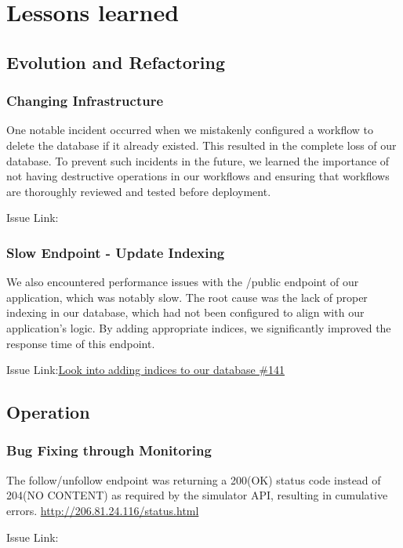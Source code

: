 \section{Lessons learned}
\subsection{Evolution and Refactoring}

\subsubsection{Changing Infrastructure}
One notable incident occurred when we mistakenly configured a workflow to delete the database if it already existed. This resulted in the complete loss of our database. To prevent such incidents in the future, we learned the importance of not having destructive operations in our workflows and ensuring that workflows are thoroughly reviewed and tested before deployment.

Issue Link:

\subsubsection{Slow Endpoint - Update Indexing}
We also encountered performance issues with the /public endpoint of our application, which was notably slow. The root cause was the lack of proper indexing in our database, which had not been configured to align with our application's logic. By adding appropriate indices, we significantly improved the response time of this endpoint.

Issue Link:\href{https://github.com/DevopsGroupC/Minitwit/issues/141}{\color{blue}Look into adding indices to our database \#141}

\subsection{Operation}

\subsubsection{Bug Fixing through Monitoring}
The follow/unfollow endpoint was returning a 200(OK) status code instead of 204(NO CONTENT) as required by the simulator API, resulting in cumulative errors.
\href{http://206.81.24.116/status.html}{http://206.81.24.116/status.html}

Issue Link:

